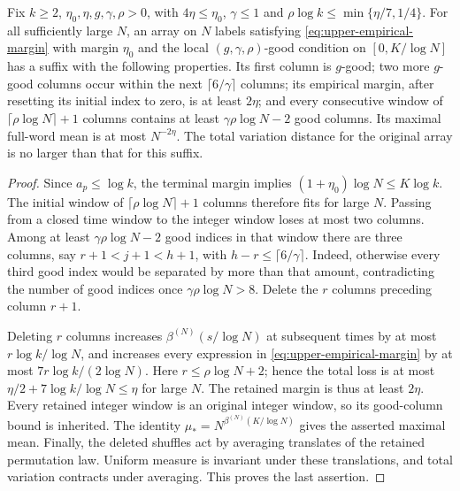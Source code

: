 \begin{lemma}\label{lem:upper-restart}
Fix $k\ge2$, $\eta_0,\eta,g,\gamma,\rho>0$, with
$4\eta\le\eta_0$, $\gamma\le1$ and
$\rho\log k\le\min\{\eta/7,1/4\}$.
For all sufficiently large $N$, an array on $N$ labels satisfying
\eqref{eq:upper-empirical-margin} with margin $\eta_0$ and the local
$(g,\gamma,\rho)$-good condition on $[0,K/\log N]$ has a suffix
with the following properties. Its first column is $g$-good; two more
$g$-good columns occur within the next $\lceil6/\gamma\rceil$ columns;
its empirical margin, after resetting its initial index to zero, is
at least $2\eta$; and every consecutive window of
$\lceil\rho\log N\rceil+1$ columns contains at least
$\gamma\rho\log N-2$ good columns. Its maximal full-word mean is at
most $N^{-2\eta}$. The total variation distance for the original array
is no larger than that for this suffix.
\end{lemma}
\begin{proof}
Since $a_p\le\log k$, the terminal margin implies
$(1+\eta_0)\log N\le K\log k$. The initial window of
$\lceil\rho\log N\rceil+1$ columns therefore fits for large $N$.
Passing from a closed time window to the integer window loses at most
two columns. Among at least $\gamma\rho\log N-2$ good indices in
that window there are three columns, say $r+1<j+1<h+1$, with
$h-r\le\lceil6/\gamma\rceil$. Indeed, otherwise every third good
index would be separated by more than that amount, contradicting
the number of good indices once $\gamma\rho\log N>8$.
Delete the $r$ columns preceding column $r+1$.

Deleting $r$ columns increases $\beta^{(N)}(s/\log N)$ at subsequent times
by at most $r\log k/\log N$, and increases every expression in
\eqref{eq:upper-empirical-margin} by at most
$7r\log k/(2\log N)$. Here $r\le\rho\log N+2$; hence the total
loss is at most $\eta/2+7\log k/\log N\le\eta$ for large $N$.
The retained margin is thus at least $2\eta$. Every retained integer
window is an original integer window, so its good-column bound is
inherited. The identity
$\mu_*=N^{\beta^{(N)}(K/\log N)}$ gives the asserted maximal mean.
Finally, the deleted shuffles act by averaging translates of the
retained permutation law. Uniform measure is invariant under these
translations, and total variation contracts under averaging. This
proves the last assertion.
\end{proof}

